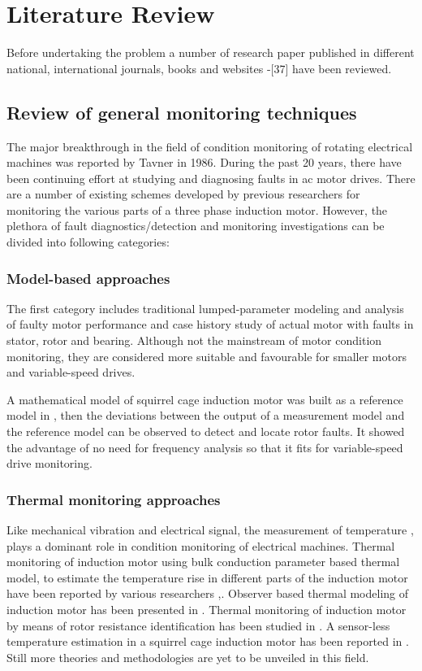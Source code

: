 \documentclass[a4paper,11pt]{report}
\begin{document}
\chapter{Literature Review}
Before undertaking the problem a number of research paper published in different national, international journals, books and websites \cite{Penman}-[37] have been reviewed.

\section{Review of general monitoring techniques} \label{lit1}
The major breakthrough in the field of condition monitoring of rotating electrical machines was reported by Tavner \cite{rps1} in 1986. During the past 20 years, there have been continuing effort at studying and diagnosing faults in ac motor drives. There are a number of existing schemes developed by previous researchers for monitoring the various parts of a three phase induction motor. However, the plethora of fault diagnostics/detection and monitoring investigations can be divided into following categories: 

\subsection*{Model-based approaches}
The first category includes traditional lumped-parameter modeling and analysis of faulty motor performance and case history study of actual motor with faults in stator, rotor and bearing. Although not the mainstream of motor condition monitoring, they are considered more suitable and favourable for smaller motors and variable-speed drives.

A mathematical model of squirrel cage induction motor was built as a reference model in \cite{70}, then the deviations between the output of a measurement model and the reference model can be observed to detect and locate rotor faults. It showed the advantage of no need for frequency analysis so that it fits for variable-speed drive monitoring.

\subsection*{Thermal monitoring approaches}
Like mechanical vibration and electrical signal, the measurement of temperature \cite{rps2},\cite{rps3} plays a dominant role in condition monitoring of electrical machines. Thermal monitoring of induction motor using bulk conduction parameter based thermal model, to estimate the temperature rise in different parts of the induction motor have been reported by various researchers \cite{rps3},\cite{rps17}. Observer based thermal modeling of induction motor has been presented in \cite{rps19}. Thermal monitoring of induction motor by means of rotor resistance identification has been studied in \cite{rps28}. A sensor-less temperature estimation in a squirrel cage induction motor has been reported in \cite{rps27}. Still more theories and methodologies are yet to be unveiled in this field.
\end{document}
